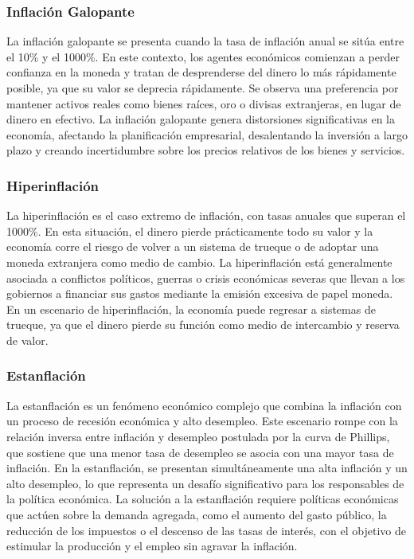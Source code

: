 \documentclass[
  stu,
  floatsintext,
  longtable,
  a4paper,
  nolmodern,
  notxfonts,
  notimes,
  12pt,
  colorlinks=true,linkcolor=blue,citecolor=blue,urlcolor=blue]{apa7}
\begin{document}
\subsubsection{Inflación Galopante}\label{inflaciuxf3n-galopante}

La inflación galopante se presenta cuando la tasa de inflación anual se
sitúa entre el 10\% y el 1000\%. En este contexto, los agentes
económicos comienzan a perder confianza en la moneda y tratan de
desprenderse del dinero lo más rápidamente posible, ya que su valor se
deprecia rápidamente. Se observa una preferencia por mantener activos
reales como bienes raíces, oro o divisas extranjeras, en lugar de dinero
en efectivo. La inflación galopante genera distorsiones significativas
en la economía, afectando la planificación empresarial, desalentando la
inversión a largo plazo y creando incertidumbre sobre los precios
relativos de los bienes y servicios.

\subsubsection{Hiperinflación}\label{hiperinflaciuxf3n}

La hiperinflación es el caso extremo de inflación, con tasas anuales que
superan el 1000\%. En esta situación, el dinero pierde prácticamente
todo su valor y la economía corre el riesgo de volver a un sistema de
trueque o de adoptar una moneda extranjera como medio de cambio. La
hiperinflación está generalmente asociada a conflictos políticos,
guerras o crisis económicas severas que llevan a los gobiernos a
financiar sus gastos mediante la emisión excesiva de papel moneda. En un
escenario de hiperinflación, la economía puede regresar a sistemas de
trueque, ya que el dinero pierde su función como medio de intercambio y
reserva de valor.

\subsubsection{Estanflación}\label{estanflaciuxf3n}

La estanflación es un fenómeno económico complejo que combina la
inflación con un proceso de recesión económica y alto desempleo. Este
escenario rompe con la relación inversa entre inflación y desempleo
postulada por la curva de Phillips, que sostiene que una menor tasa de
desempleo se asocia con una mayor tasa de inflación. En la estanflación,
se presentan simultáneamente una alta inflación y un alto desempleo, lo
que representa un desafío significativo para los responsables de la
política económica. La solución a la estanflación requiere políticas
económicas que actúen sobre la demanda agregada, como el aumento del
gasto público, la reducción de los impuestos o el descenso de las tasas
de interés, con el objetivo de estimular la producción y el empleo sin
agravar la inflación.
\end{document}
